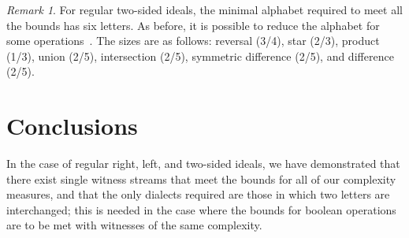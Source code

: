 \documentclass[final]{dmtcs-episciences}
\theoremstyle{definition}
\theoremstyle{remark}
\newtheorem{remark}{Remark}
\begin{document}
\begin{remark}
For regular two-sided ideals, the minimal alphabet required to meet all the bounds has six letters. 
As before, it is possible to reduce the alphabet for some operations~\cite{BJL13}. The sizes are as follows:
reversal (3/4), star (2/3), product (1/3), union (2/5), intersection (2/5), symmetric difference (2/5), and difference (2/5). 

\end{remark}

\section{Conclusions}
In the case of regular right, left, and two-sided ideals,
we have demonstrated that there exist  single witness streams that meet the bounds for all of our complexity measures, and that the only dialects required are those in which two  letters are interchanged; this is needed in the case where the bounds for boolean operations are to be met with witnesses of the same complexity.
\providecommand{\noopsort}[1]{}
\end{document}
